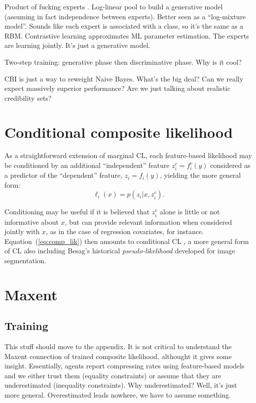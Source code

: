 \documentclass[english]{scrartcl}
\begin{document}
{\color{red}Product of fucking experts \cite{Hinton-02}. Log-linear pool to build a generative model (assuming in fact independence between experts). Better seen as a ``log-mixture model''. Sounds like each expert is associated with a class, so it's the same as a RBM. Contrastive learning approximates ML parameter estimation. The experts are learning jointly. It's just a generative model.}

{\color{red}Two-step training: generative phase then discriminative phase. Why is it cool?}

{\color{red}CBI is just a way to reweight Naive Bayes. What's the big deal? Can we really expect massively superior performance? Are we just talking about realistic credibility sets?}


\appendix

\section{Conditional composite likelihood}
\label{sec:conditional}

As a straightforward  extension of marginal CL, each feature-based likelihood may be conditioned by an additional ``independent'' feature $z^c_i = f^c_i(y)$ considered as a predictor of the ``dependent'' feature, $z_i=f_i(y)$, yielding the more general form:
\begin{equation}
\label{eq:cond_feat_lik}
\ell_i(x) = p(z_i|x,z^c_i).
\end{equation}

Conditioning may be useful if it is believed that $z^c_i$ alone is little or not informative about $x$, but can provide relevant information when considered jointly with $x$, as in the case of regression covariates, for instance. Equation~(\ref{eq:comp_lik}) then amounts to conditional CL \cite{Varin-11}, a more general form of CL also including Besag's historical {\em pseudo-likelihood} \cite{Besag-74} developed for image segmentation.

\section{Maxent}

\subsection{Training}
\label{sec:maxent}

{\color{red}This stuff should move to the appendix. It is not critical to understand the Maxent connection of trained composite likelihood, althought it gives some insight. Essentially, agents report compressing rates using feature-based models and we either trust them (equality constraints) or assume that they are underestimated (inequality constraints). Why underestimated? Well, it's just more general. Overestimated leads nowhere, we have to assume something.}
\end{document}
